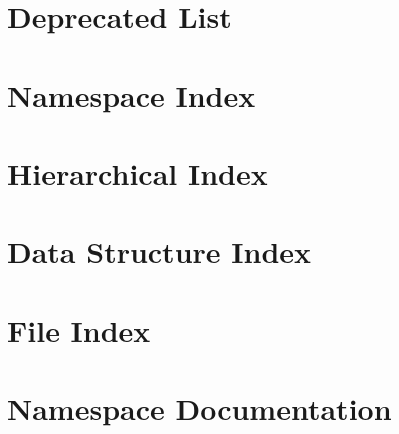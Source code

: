 \let\mypdfximage\pdfximage\def\pdfximage{\immediate\mypdfximage}\documentclass[twoside]{book}
\newcommand{\+}{\discretionary{\mbox{\scriptsize$\hookleftarrow$}}{}{}}
\begin{document}
\chapter{Deprecated List}
\label{deprecated}

\chapter{Namespace Index}

\chapter{Hierarchical Index}

\chapter{Data Structure Index}

\chapter{File Index}

\chapter{Namespace Documentation}

\end{document}
